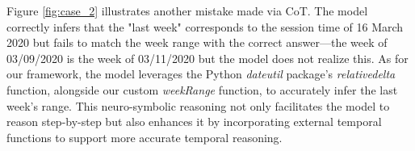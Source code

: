 Figure \ref{fig:case_2} illustrates another mistake made via CoT. The model correctly infers that the "last week" corresponds to the session time of 16 March 2020 but fails to match the week range with the correct answer—the week of 03/09/2020 is the week of 03/11/2020 but the model does not realize this. As for our framework, the model leverages the Python \textit{dateutil} package's \textit{relativedelta} function, alongside our custom \textit{weekRange} function, to accurately infer the last week's range. This neuro-symbolic reasoning not only facilitates the model to reason step-by-step but also enhances it by incorporating external temporal functions to support more accurate temporal reasoning.